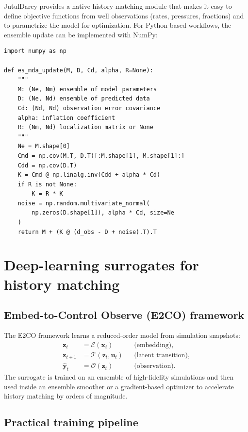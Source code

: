 \documentclass[10pt,a4paper]{article}
\begin{document}
JutulDarcy provides a native history-matching module that makes it easy to
define objective functions from well observations (rates, pressures, fractions)
and to parametrize the model for optimization. For Python-based workflows,
the ensemble update can be implemented with NumPy:

\begin{lstlisting}[caption={ES-MDA update in NumPy.}]
import numpy as np

def es_mda_update(M, D, Cd, alpha, R=None):
    """
    M: (Ne, Nm) ensemble of model parameters
    D: (Ne, Nd) ensemble of predicted data
    Cd: (Nd, Nd) observation error covariance
    alpha: inflation coefficient
    R: (Nm, Nd) localization matrix or None
    """
    Ne = M.shape[0]
    Cmd = np.cov(M.T, D.T)[:M.shape[1], M.shape[1]:]
    Cdd = np.cov(D.T)
    K = Cmd @ np.linalg.inv(Cdd + alpha * Cd)
    if R is not None:
        K = R * K
    noise = np.random.multivariate_normal(
        np.zeros(D.shape[1]), alpha * Cd, size=Ne
    )
    return M + (K @ (d_obs - D + noise).T).T
\end{lstlisting}

\section{Deep-learning surrogates for history matching}

\subsection{Embed-to-Control Observe (E2CO) framework}

The E2CO framework learns a reduced-order model from simulation snapshots:
\begin{align}
  \bm{z}_t &= \mathcal{E}(\bm{x}_t) && \text{(embedding)}, \\
  \bm{z}_{t+1} &= \mathcal{T}(\bm{z}_t,\bm{u}_t) && \text{(latent transition)}, \\
  \hat{\bm{y}}_t &= \mathcal{O}(\bm{z}_t) && \text{(observation)}.
\end{align}
The surrogate is trained on an ensemble of high-fidelity simulations and then
used inside an ensemble smoother or a gradient-based optimizer to accelerate
history matching by orders of magnitude.

\subsection{Practical training pipeline}
\end{document}
